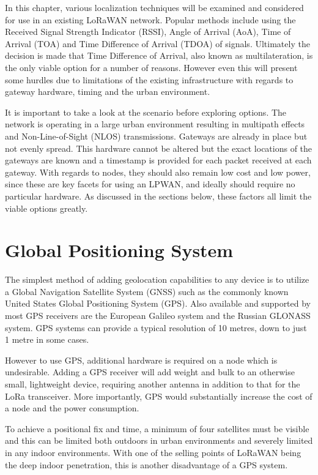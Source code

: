 \documentclass[a4paper]{report}
\begin{document}
  In this chapter, various localization techniques will be examined and considered for use in an existing LoRaWAN network. Popular methods include using the Received Signal Strength Indicator (RSSI), Angle of Arrival (AoA), Time of Arrival (TOA) and Time Difference of Arrival (TDOA) of signals. Ultimately the decision is made that Time Difference of Arrival, also known as multilateration, is the only viable option for a number of reasons. However even this will present some hurdles due to limitations of the existing infrastructure with regards to gateway hardware, timing and the urban environment.

  It is important to take a look at the scenario before exploring options. The network is operating in a large urban environment resulting in multipath effects and Non-Line-of-Sight (NLOS) transmissions. Gateways are already in place but not evenly spread. This hardware cannot be altered but the exact locations of the gateways are known and a timestamp is provided for each packet received at each gateway. With regards to nodes, they should also remain low cost and low power, since these are key facets for using an LPWAN, and ideally should require no particular hardware. As discussed in the sections below, these factors all limit the viable options greatly.

  \section{Global Positioning System}
    The simplest method of adding geolocation capabilities to any device is to utilize a Global Navigation Satellite System (GNSS) such as the commonly known United States Global Positioning System (GPS). Also available and supported by most GPS receivers are the European Galileo system and the Russian GLONASS system. GPS systems can provide a typical resolution of 10 metres, down to just 1 metre in some cases.

    However to use GPS, additional hardware is required on a node which is undesirable. Adding a GPS receiver will add weight and bulk to an otherwise small, lightweight device, requiring another antenna in addition to that for the LoRa transceiver. More importantly, GPS would substantially increase the cost of a node and the power consumption.

    To achieve a positional fix and time, a minimum of four satellites must be visible and this can be limited both outdoors in urban environments and severely limited in any indoor environments. With one of the selling points of LoRaWAN being the deep indoor penetration, this is another disadvantage of a GPS system.
\end{document}
